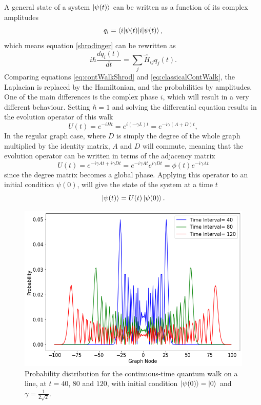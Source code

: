 \documentclass[../../dissertation.tex]{subfiles}
\begin{document}
A general state of a system $\ket{\psi(t)}$ can be written as a function of
its complex amplitudes 
\begin{equation}
	q_i = \braket{i|\psi(t)},
\end{equation}
which means equation \eqref{shrodinger} can be rewritten as 
\begin{equation}
	i\hbar \frac{dq_i(t)}{dt} = \sum_j \hat{H}_{ij} q_j(t).
	\label{eq:contWalkShrod}
\end{equation}
Comparing equations \eqref{eq:contWalkShrod} and \eqref{eq:classicalContWalk},
the Laplacian is replaced by the Hamiltonian, and the probabilities by
amplitudes. One of the main differences is the complex phase $i$, which will
result in a very different behaviour.  Setting $\hbar = 1$ and solving the
differential equation results in the evolution operator of this walk 
\begin{equation}
	U(t) = e^{-iHt} = e^{i(-\gamma L)t} = e^{-i\gamma(A+D)t},
\end{equation}
In the regular graph case, where $D$ is simply the degree of the whole graph
multiplied by the identity matrix, $A$ and $D$ will commute, meaning that the
evolution operator can be written in terms of the adjacency matrix 
\begin{equation}
	U(t) = e^{-i\gamma A t + i\gamma D t} = e^{-i\gamma A t} e^{i\gamma D t} = \phi(t) e^{-i\gamma A t} 
	\label{eq:contSimulUniOp}
\end{equation}
since the degree matrix becomes a global phase.  Applying this operator to an
initial condition $\psi(0)$, will give the state of the system at a time $t$
\begin{equation}
	\ket{\psi(t)} = U(t)\ket{\psi(0)}.
\end{equation}\par
\begin{figure}[!h]
	\centering
	\includegraphics[scale=0.40]{img/ContQuantumWalk/ctqwMultipleTime.png}
	\caption{Probability distribution for the continuous-time quantum walk on a line, at $t=40$, $80$ and $120$, with initial condition $\ket{\psi(0)}=\ket{0}$ and $\gamma=\frac{1}{2\sqrt{2}}$.} 
	\label{fig:contdist0}
\end{figure}
\end{document}
